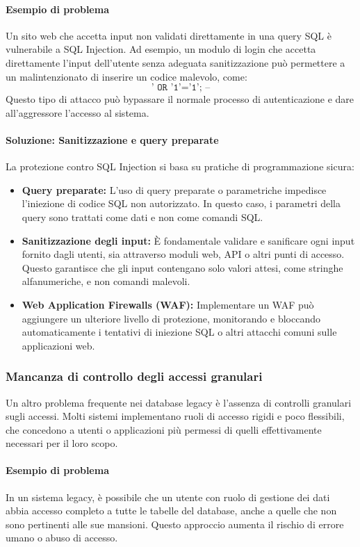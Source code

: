 \paragraph{Esempio di problema}
Un sito web che accetta input non validati direttamente in una query SQL è vulnerabile a SQL Injection. Ad esempio, un modulo di login che accetta direttamente l'input dell'utente senza adeguata sanitizzazione può permettere a un malintenzionato di inserire un codice malevolo, come:
\[
\texttt{' OR '1'='1'; --}
\]
Questo tipo di attacco può bypassare il normale processo di autenticazione e dare all'aggressore l'accesso al sistema.

\paragraph{Soluzione: Sanitizzazione e query preparate}
La protezione contro SQL Injection si basa su pratiche di programmazione sicura:
\begin{itemize}
    \item \textbf{Query preparate:} L'uso di query preparate o parametriche impedisce l'iniezione di codice SQL non autorizzato. In questo caso, i parametri della query sono trattati come dati e non come comandi SQL.
    \item \textbf{Sanitizzazione degli input:} È fondamentale validare e sanificare ogni input fornito dagli utenti, sia attraverso moduli web, API o altri punti di accesso. Questo garantisce che gli input contengano solo valori attesi, come stringhe alfanumeriche, e non comandi malevoli.
    \item \textbf{Web Application Firewalls (WAF):} Implementare un WAF può aggiungere un ulteriore livello di protezione, monitorando e bloccando automaticamente i tentativi di iniezione SQL o altri attacchi comuni sulle applicazioni web.
\end{itemize}

\subsubsection{Mancanza di controllo degli accessi granulari}
Un altro problema frequente nei database legacy è l'assenza di controlli granulari sugli accessi. Molti sistemi implementano ruoli di accesso rigidi e poco flessibili, che concedono a utenti o applicazioni più permessi di quelli effettivamente necessari per il loro scopo.

\paragraph{Esempio di problema}
In un sistema legacy, è possibile che un utente con ruolo di gestione dei dati abbia accesso completo a tutte le tabelle del database, anche a quelle che non sono pertinenti alle sue mansioni. Questo approccio aumenta il rischio di errore umano o abuso di accesso.

